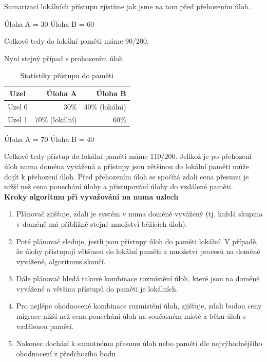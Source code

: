 \documentclass[a4paper,12pt]{article}
\begin{document}
\noindent
Sumarizací lokálních přístupu zjistíme jak jsme na tom před přehozením úloh.

\noindent
Úloha A = 30
Úloha B = 60

\noindent
Celkově tedy do lokální paměti máme 90/200.

\noindent
Nyní stejný případ s prohozením úloh

\begin{table}[h]
\centering
\begin{tabular}{|c|r|r|}
\hline
Uzel & Úloha A & Úloha B \\
\hline
Uzel 0 & 30\% & 40\% (lokální)\\
\hline
Uzel 1 & 70\% (lokální) & 60\% \\
\hline
\end{tabular}
\caption{Statistiky přístupu do paměti}
\label{table6}
\end{table}

\noindent
Úloha A = 70
Úloha B = 40

\noindent
Celkově tedy přístup do lokální paměti máme 110/200. Jelikož je po přehození úloh numa doména vyvážená a přístupy jsou většinou do lokální paměti může dojít k přehození úloh. Před přehozením úloh se spočítá zdali cena přesunu je nižší než cena ponechání úlohy a přistupování úlohy do vzdálené paměti. \\


\noindent
\textbf{Kroky algoritmu při vyvažování na numa uzlech}
\begin{enumerate}
\item Plánovač zjišťuje, zdali je systém v numa doméně vyvážený (tj. každá skupina v doméně má přibližně stejné množství běžících úloh).
\item Poté plánovač sleduje, jestli jsou přístupy úloh do paměti lokální. V případě, že úlohy přistupují většinou do lokální paměti a množství procesů na doméně vyvážené, algoritmus skončí. 
\item Dále plánovač hledá takové kombinace rozmístění úloh, které jsou na doméně vyvážené a většinu přístupů do paměti je lokálních.
\item Pro nejlépe ohodnocené kombinace rozmístění úloh, zjišťuje, zdali budou ceny migrace nižší než cena ponechání úloh na současném místě a běhu úloh s vzdálenou pamětí.
\item Nakonec dochází k samotnému přesunu úloh nebo pamětí dle nejvýhodnějšího ohodnocení z předchozího bodu
\end{enumerate}
\end{document}
